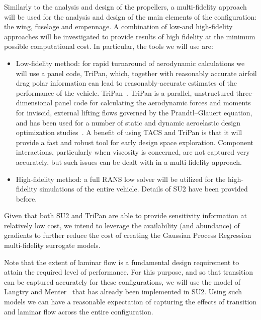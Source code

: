 \documentclass[]{aiaa-tc}
\begin{document}
    Similarly to the analysis and design of the propellers, a multi-fidelity approach will be used for the analysis and design of the main elements of the configuration: the wing, fuselage and empennage.  A combination of low-and high-fidelity approaches will be investigated to provide results of high fidelity at the minimum possible computational cost.  In particular, the tools we will use are:
%
    \begin{itemize}
    \item Low-fidelity method: for rapid turnaround of aerodynamic calculations we will use a panel code, TriPan, which, 
    together with reasonably accurate airfoil drag polar information can lead to reasonably-accurate estimates of 
    the performance of the vehicle. TriPan~\cite{Kennedy:2014:tacs-tripan}. TriPan is a parallel, unstructured 
    three-dimensional panel code for calculating the aerodynamic forces and moments for inviscid, external lifting 
    flows governed by the Prandtl--Glauert equation, and has been used for a number of static and dynamic 
    aeroelastic design optimization studies~\cite{Kennedy:2014:tacs-tripan, Kennedy:2012:CMC,Kennedy:2013:SDM, 
    Kennedy:2014:High-aspect-ratio, Kennedy:2014:Aviation}. A benefit of using TACS and TriPan is that
    it will provide a fast and robust tool for early design space exploration. Component interactions, 
    particularly when viscosity is concerned, are not captured very accurately, but such issues 
    can be dealt with in a  multi-fidelity approach.

    \item High-fidelity method: a full RANS low solver will be utilized for the high-fidelity 
    simulations of the entire vehicle.  Details of SU2 have been provided before.
    \end{itemize}
    Given that both SU2 and TriPan are able to provide sensitivity information at relatively low cost, we intend to leverage the availability (and abundance) of gradients to further reduce the cost of creating the Gaussian Process Regression multi-fidelity surrogate models.

    Note that the extent of laminar flow is a fundamental design requirement to attain the required level of performance.  For this purpose, and so that transition can be captured accurately for these configurations, we will use the model of Langtry and Menter~\cite{Langtry:Correlation} that has already been implemented in SU2.  Using such models we can have a reasonable expectation of capturing the effects of transition and laminar flow across the entire configuration.          
\end{document}
